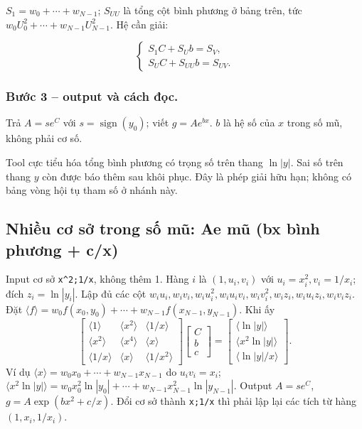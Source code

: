$S_1=w_0+\cdots+w_{N-1}$; $S_{UU}$ là tổng cột bình phương ở bảng trên, tức $w_0U_0^2+\cdots+w_{N-1}U_{N-1}^2$. Hệ cần giải:

\[\boxed{\begin{cases}S_1C+S_Ub=S_V,\\S_UC+S_{UU}b=S_{UV}.\end{cases}}\]

\subsubsection*{Bước 3 -- output và cách đọc.} Trả $A=se^C$ với $s=\operatorname{sign}(y_0)$; viết $g=Ae^{bx}$. $b$ là hệ số của $x$ trong số mũ, không phải cơ số.

Tool cực tiểu hóa tổng bình phương có trọng số trên thang $\ln|y|$. Sai số trên thang $y$ còn được báo thêm sau khôi phục. Đây là phép giải hữu hạn; không có bảng vòng hội tụ tham số ở nhánh này.

\subsection{Nhiều cơ sở trong số mũ: Ae mũ (bx bình phương + c/x)}
Input cơ sở \texttt{x\^{}2;1/x}, không thêm 1. Hàng $i$ là $(1,u_i,v_i)$ với $u_i=x_i^2,v_i=1/x_i$; đích $z_i=\ln|y_i|$. Lập đủ các cột $w_iu_i,w_iv_i,w_iu_i^2,w_iu_iv_i,w_iv_i^2,w_iz_i,w_iu_iz_i,w_iv_iz_i$.
Đặt $\langle f\rangle=w_0f(x_0,y_0)+\cdots+w_{N-1}f(x_{N-1},y_{N-1})$. Khi ấy
\[
\begin{bmatrix}\langle1\rangle&\langle x^2\rangle&\langle1/x\rangle\\
\langle x^2\rangle&\langle x^4\rangle&\langle x\rangle\\
\langle1/x\rangle&\langle x\rangle&\langle1/x^2\rangle\end{bmatrix}
\begin{bmatrix}C\\b\\c\end{bmatrix}
=\begin{bmatrix}\langle\ln|y|\rangle\\\langle x^2\ln|y|\rangle\\\langle\ln|y|/x\rangle\end{bmatrix}.
\]
Ví dụ $\langle x\rangle=w_0x_0+\cdots+w_{N-1}x_{N-1}$ do $u_iv_i=x_i$;
$\langle x^2\ln|y|\rangle=w_0x_0^2\ln|y_0|+\cdots+w_{N-1}x_{N-1}^2\ln|y_{N-1}|$.
Output $A=se^C$, $g=A\exp(bx^2+c/x)$. Đổi cơ sở thành \texttt{x;1/x} thì phải lập lại các tích từ hàng $(1,x_i,1/x_i)$.


